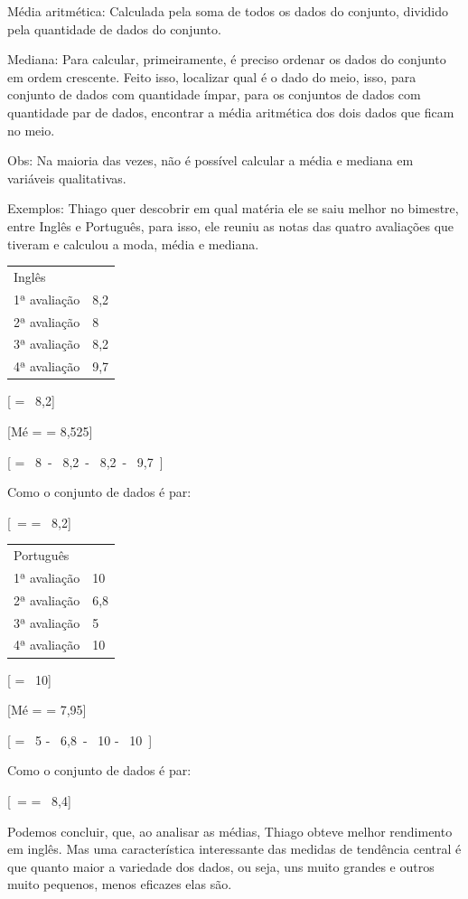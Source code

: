Média aritmética: Calculada pela soma de todos os dados do conjunto,
dividido pela quantidade de dados do conjunto.

Mediana: Para calcular, primeiramente, é preciso ordenar os dados do
conjunto em ordem crescente. Feito isso, localizar qual é o dado do
meio, isso, para conjunto de dados com quantidade ímpar, para os
conjuntos de dados com quantidade par de dados, encontrar a média
aritmética dos dois dados que ficam no meio.

Obs: Na maioria das vezes, não é possível calcular a média e mediana em
variáveis qualitativas.

Exemplos: Thiago quer descobrir em qual matéria ele se saiu melhor no
bimestre, entre Inglês e Português, para isso, ele reuniu as notas das
quatro avaliações que tiveram e calculou a moda, média e mediana.

\begin{longtable}[]{@{}ll@{}}
\toprule
\endhead
Inglês &\tabularnewline
1ª avaliação & 8,2\tabularnewline
2ª avaliação & 8\tabularnewline
3ª avaliação & 8,2\tabularnewline
4ª avaliação & 9,7\tabularnewline
\bottomrule
\end{longtable}

[ = \ 8,2]

[Mé =  = 8,525]

[ = \ 8\  - \ 8,2\  - \ 8,2\  - \ 9,7\ ]

Como o conjunto de dados é par:

[\  =  = \ 8,2]

\begin{longtable}[]{@{}ll@{}}
\toprule
\endhead
Português~ &\tabularnewline
1ª avaliação & 10\tabularnewline
2ª avaliação & 6,8\tabularnewline
3ª avaliação & 5\tabularnewline
4ª avaliação & 10\tabularnewline
\bottomrule
\end{longtable}

[ = \ 10]

[Mé =  = 7,95]

[ = \ 5 - \ 6,8\  - \ 10 - \ 10\ ]

Como o conjunto de dados é par:

[\  =  = \ 8,4]

Podemos concluir, que, ao analisar as médias, Thiago obteve melhor
rendimento em inglês. Mas uma característica interessante das medidas de
tendência central é que quanto maior a variedade dos dados, ou seja, uns
muito grandes e outros muito pequenos, menos eficazes elas são.

